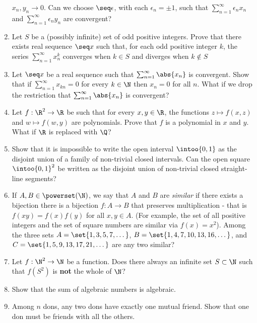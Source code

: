 \documentclass[12pt,a4paper]{article}
\begin{document}
\begin{enumerate}
       \(x_n, y_n \to 0\). Can we choose \(\seq \epsilon\), with each
       \(\epsilon_n = \pm 1\), such that
       \(\sum_{n = 1}^\infty \epsilon_n x_n\) and
       \(\sum_{n = 1}^\infty \epsilon_n y_n\) are convergent?
 \item Let \(S\) be a (possibly infinite) set of odd positive integers. Prove
       that there exists real sequence \(\seq x\) such that, for each odd
       positive integer \(k\), the series \(\sum_{n = 1}^\infty x_n^k\)
       converges when \(k \in S\) and diverges when \(k \notin S\)
 \item Let \(\seq x\) be a real sequence such that
       \(\sum_{n = 1}^\infty \abs{x_n}\) is convergent. Show that if
       \(\sum_{n = 1}^\infty x_{kn} = 0\) for every \(k \in \N\) then
       \(x_n = 0\) for all \(n\). What if we drop the restriction that
       \(\sum_{n = 1}^\infty \abs{x_n}\) is convergent?
 \item Let \(f: \R^2 \to \R\) be such that for every \(x, y \in \R\), the
       functions \(z \mapsto f(x, z)\) and \(w \mapsto f(w, y)\) are
       polynomials. Prove that \(f\) is a polynomial in \(x\) and \(y\). What if
       \(\R\) is replaced with \(\Q\)?
 \item Show that it is impossible to write the open interval
       \(\intoo{0, 1}\) as the
       disjoint union of a family of non-trivial closed intervals. Can the open
       square \(\intoo{0, 1}^2\) be written as the disjoint union of non-trivial
       closed straight-line segments?
 \item If \(A, B \in \powerset(\N)\), we say that \(A\) and \(B\) are
       \emph{similar} if there exists a bijection there is a bijection
       \(f: A \to B\) that preserves multiplication - that is
       \(f(xy) = f(x)f(y)\) for all \(x, y \in A\). (For example, the set of all
       positive integers and the set of square numbers are similar via
       \(f(x) = x^2\)). Among the three sets \(A = \set{1, 3, 5, 7, \dotsc}\),
       \(B = \set{1, 4, 7, 10, 13, 16, \dotsc}\),
       and \(C = \set{1, 5, 9, 13, 17, 21, \dotsc}\) are any two similar?
 \item Let \(f : \N^2 \to \N\) be a function. Does there always an infinite
       set \(S \subset \N\) such that \(f(S^2)\) is \textbf{not} the whole of
       \(\N\)?
 \item Show that the sum of algebraic numbers is algebraic.
 \item Among \(n\) dons, any two dons have exactly one mutual friend. Show that
       one don must be friends with all the others.
\end{enumerate}
\end{document}
